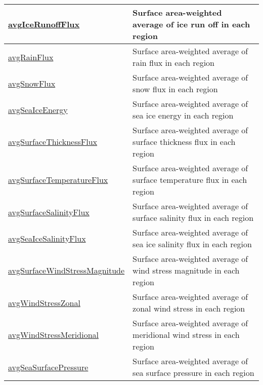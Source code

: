 {\begin{center}
\begin{longtable}{| p{2.0in} | p{4.0in} |}
    \hline
    \hyperref[subsec:var_sec_surfaceAreaWeightedAveragesAM_avgIceRunoffFlux]{avgIceRunoffFlux} & Surface area-weighted average of ice run off in each region \\
    \hline
    \hyperref[subsec:var_sec_surfaceAreaWeightedAveragesAM_avgRainFlux]{avgRainFlux} & Surface area-weighted average of rain flux in each region \\
    \hline
    \hyperref[subsec:var_sec_surfaceAreaWeightedAveragesAM_avgSnowFlux]{avgSnowFlux} & Surface area-weighted average of snow flux in each region \\
    \hline
    \hyperref[subsec:var_sec_surfaceAreaWeightedAveragesAM_avgSeaIceEnergy]{avgSeaIceEnergy} & Surface area-weighted average of sea ice energy in each region \\
    \hline
    \hyperref[subsec:var_sec_surfaceAreaWeightedAveragesAM_avgSurfaceThicknessFlux]{avgSurfaceThicknessFlux} & Surface area-weighted average of surface thickness flux in each region \\
    \hline
    \hyperref[subsec:var_sec_surfaceAreaWeightedAveragesAM_avgSurfaceTemperatureFlux]{avgSurfaceTemperatureFlux} & Surface area-weighted average of surface temperature flux in each region \\
    \hline
    \hyperref[subsec:var_sec_surfaceAreaWeightedAveragesAM_avgSurfaceSalinityFlux]{avgSurfaceSalinityFlux} & Surface area-weighted average of surface salinity flux in each region \\
    \hline
    \hyperref[subsec:var_sec_surfaceAreaWeightedAveragesAM_avgSeaIceSalinityFlux]{avgSeaIceSalinityFlux} & Surface area-weighted average of sea ice salinity flux in each region \\
    \hline
    \hyperref[subsec:var_sec_surfaceAreaWeightedAveragesAM_avgSurfaceWindStressMagnitude]{avgSurfaceWindStressMagnitude} & Surface area-weighted average of wind stress magnitude in each region \\
    \hline
    \hyperref[subsec:var_sec_surfaceAreaWeightedAveragesAM_avgWindStressZonal]{avgWindStressZonal} & Surface area-weighted average of zonal wind stress in each region \\
    \hline
    \hyperref[subsec:var_sec_surfaceAreaWeightedAveragesAM_avgWindStressMeridional]{avgWindStressMeridional} & Surface area-weighted average of meridional wind stress in each region \\
    \hline
    \hyperref[subsec:var_sec_surfaceAreaWeightedAveragesAM_avgSeaSurfacePressure]{avgSeaSurfacePressure} & Surface area-weighted average of sea surface pressure in each region \\

\end{longtable}
\end{center}}
